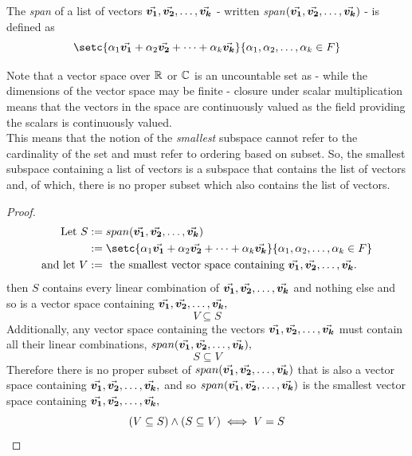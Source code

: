 \documentclass[MathsNotesBase.tex]{subfiles}
\begin{document}
	
\bigskip\bigskip\bigskip\bigskip
{}
	
	\begin{definition}
	The \emph{span} of a list of vectors $\vec{\bm{v_1}}, \vec{\bm{v_2}}, \dots , \vec{\bm{v_k}}$ - written \emph{span$(\vec{\bm{v_1}}, \vec{\bm{v_2}}, \dots , \vec{\bm{v_k}})$} - is defined as
	\[ \setc{\alpha{_1}\V{v_1} + \alpha{_2}\V{v_2} + \dots + \alpha{_k}\V{v_k}}{\alpha{_1}, \alpha{_2}, \dots , \alpha{_k} \in F} \]
	\end{definition}
	
	\bigskip
	Note that a vector space over $\mathbb{R}^{}$ or $\mathbb{C}^{}$ is an uncountable set as - while the dimensions of the vector space may be finite - closure under scalar multiplication means that the vectors in the space are continuously valued as the field providing the scalars is continuously valued.\\
	This means that the notion of the \emph{smallest} subspace cannot refer to the cardinality of the set and must refer to ordering based on subset. So, the smallest subspace containing a list of vectors is a subspace that contains the list of vectors and, of which, there is no proper subset which also contains the list of vectors.	
	\begin{proof}
		\begin{align*}
		\text{Let } S &:= span(\V{v_1}, \V{v_2}, \dots , \V{v_k})\\
		 &:= \setc{\alpha{_1}\V{v_1} + \alpha{_2}\V{v_2} + \dots + \alpha{_k}\V{v_k}}{\alpha{_1}, \alpha{_2}, \dots , \alpha{_k} \in F}\\
		\text{and let }V &:= \text{ the smallest vector space containing }\V{v_1}, \V{v_2}, \dots , \V{v_k}.	 
		\end{align*}
		then $S$ contains every linear combination of $\vec{\bm{v_1}}, \vec{\bm{v_2}}, \dots , \vec{\bm{v_k}}$ and nothing else and so is a vector space containing $\vec{\bm{v_1}}, \vec{\bm{v_2}}, \dots , \vec{\bm{v_k}},$\\
		\[ V \subseteq S \]
		Additionally, any vector space containing the vectors $\vec{\bm{v_1}}, \vec{\bm{v_2}}, \dots , \vec{\bm{v_k}}$ must contain all their linear combinations, $span(\vec{\bm{v_1}}, \vec{\bm{v_2}}, \dots , \vec{\bm{v_k}}),$\\
		\[ S \subseteq V \]
		Therefore there is no proper subset of $span(\vec{\bm{v_1}}, \vec{\bm{v_2}}, \dots , \vec{\bm{v_k}})$ that is also a vector space containing $\vec{\bm{v_1}}, \vec{\bm{v_2}}, \dots , \vec{\bm{v_k}},$ and so $span(\vec{\bm{v_1}}, \vec{\bm{v_2}}, \dots , \vec{\bm{v_k}})$ is the smallest vector space containing $\vec{\bm{v_1}}, \vec{\bm{v_2}}, \dots , \vec{\bm{v_k}},$\\
		\[ (V \subseteq S) \wedge (S \subseteq V) \iff V = S \qedhere \]
	\end{proof}
	
\end{document}
